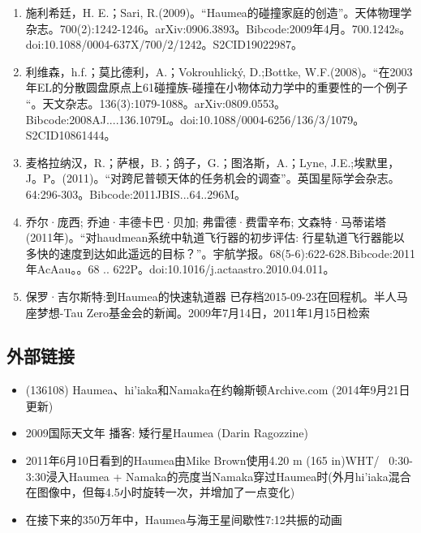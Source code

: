 \begin{enumerate}
\item 施利希廷，H. E.；Sari, R.(2009)。“Haumea的碰撞家庭的创造”。天体物理学杂志。700(2):1242-1246。arXiv:0906.3893。Bibcode:2009年4月。700.1242s。doi:10.1088/0004-637X/700/2/1242。S2CID19022987。  
\item 利维森，h.f.；莫比德利，A.；Vokrouhlický, D.;Bottke, W.F.(2008)。“在2003年EL的分散圆盘原点上61碰撞族-碰撞在小物体动力学中的重要性的一个例子 “。天文杂志。136(3):1079-1088。arXiv:0809.0553。Bibcode:2008AJ....136.1079L。doi:10.1088/0004-6256/136/3/1079。S2CID10861444。  
\item 麦格拉纳汉，R.；萨根，B.；鸽子，G.；图洛斯，A.；Lyne, J.E.;埃默里，J。P。(2011)。“对跨尼普顿天体的任务机会的调查”。英国星际学会杂志。64:296-303。Bibcode:2011JBIS...64..296M。
\item 乔尔·庞西; 乔迪·丰德卡巴·贝加; 弗雷德·费雷辛布; 文森特·马蒂诺塔 (2011年)。“对haudmean系统中轨道飞行器的初步评估: 行星轨道飞行器能以多快的速度到达如此遥远的目标？”。宇航学报。68(5-6):622-628.Bibcode:2011年AcAau。。68 .. 622P。doi:10.1016/j.actaastro.2010.04.011。
\item 保罗·吉尔斯特:到Haumea的快速轨道器 已存档2015-09-23在回程机。半人马座梦想-Tau Zero基金会的新闻。2009年7月14日，2011年1月15日检索
\end{enumerate}
\subsection{外部链接}
\begin{itemize}
\item (136108) Haumea、hi'iaka和Namaka在约翰斯顿Archive.com (2014年9月21日更新)
\item 2009国际天文年 播客: 矮行星Haumea (Darin Ragozzine)
\item 2011年6月10日看到的Haumea由Mike Brown使用4.20 m (165 in)WHT/~ 0:30-3:30浸入Haumea + Namaka的亮度当Namaka穿过Haumea时(外月hi'iaka混合在图像中，但每4.5小时旋转一次，并增加了一点变化)
\item 在接下来的350万年中，Haumea与海王星间歇性7:12共振的动画
\end{itemize}